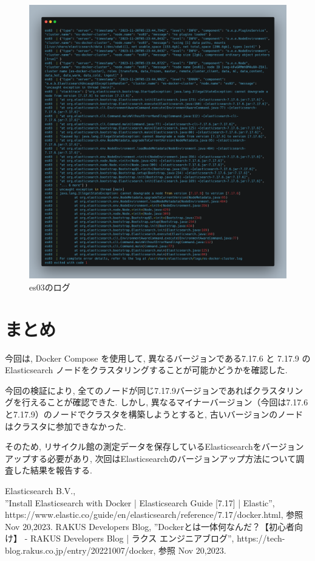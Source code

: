\documentclass[a4j,12pt,]{jarticle}
\begin{document}
\begin{figure}[H]
  \begin{center}
    \includegraphics[width=160mm]{log.png}
    \caption{es03のログ}
    \label{p3}
  \end{center}
\end{figure}

\section{まとめ}
今回は, Docker Compose を使用して, 異なるバージョンである7.17.6 と 7.17.9 の Elasticsearch ノードをクラスタリングすることが可能かどうかを確認した.

今回の検証により, 全てのノードが同じ7.17.9バージョンであればクラスタリングを行えることが確認できた. しかし, 異なるマイナーバージョン（今回は7.17.6と7.17.9）のノードでクラスタを構築しようとすると, 古いバージョンのノードはクラスタに参加できなかった.

そのため, リサイクル館の測定データを保存しているElasticsearchをバージョンアップする必要があり, 次回はElasticsearchのバージョンアップ方法について調査した結果を報告する.

\begin{thebibliography}{5}
  Elasticsearch B.V.,\\ ”Install Elasticsearch with Docker | Elasticsearch Guide [7.17] | Elastic”, https://www.elastic.co/guide/en/elasticsearch/reference/7.17/docker.html, 参照 Nov 20,2023.
  RAKUS Developers Blog, ”Dockerとは一体何なんだ？【初心者向け】 - RAKUS Developers Blog | ラクス エンジニアブログ”, https://tech-blog.rakus.co.jp/entry/20221007/docker, 参照 Nov 20,2023.
\end{thebibliography}
\end{document}

